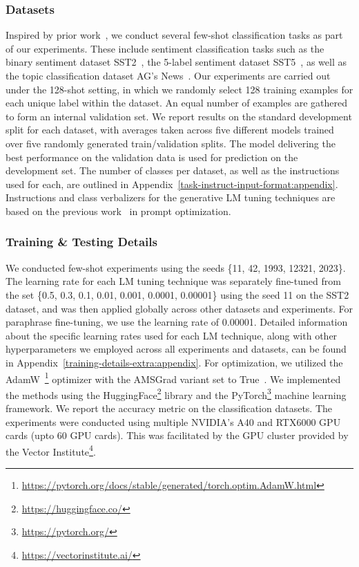 \documentclass[11pt]{article}
\begin{document}
\subsubsection{Datasets}
Inspired by prior work~\cite{gao-etal-2021-making, deng-etal-2022-rlprompt}, we conduct several few-shot classification tasks as part of our experiments. These include sentiment classification tasks such as the binary sentiment dataset SST2~\cite{socher-etal-2013-recursive}, the 5-label sentiment dataset SST5~\cite{socher-etal-2013-recursive}, as well as the topic classification dataset AG's News~\cite{NIPS2015_250cf8b5}. Our experiments are carried out under the 128-shot setting, in which we randomly select 128 training examples for each unique label within the dataset. An equal number of examples are gathered to form an internal validation set. We report results on the standard development split for each dataset, with averages taken across five different models trained over five randomly generated train/validation splits. The model delivering the best performance on the validation data is used for prediction on the development set. The number of classes per dataset, as well as the instructions used for each, are outlined in Appendix~\ref{task-instruct-input-format:appendix}. Instructions and class verbalizers for the generative LM tuning techniques are based on the previous work~\cite{deng-etal-2022-rlprompt} in prompt optimization.
\subsubsection{Training \& Testing Details}
We conducted few-shot experiments using the seeds \{11, 42, 1993, 12321, 2023\}. The learning rate for each LM tuning technique was separately fine-tuned from the set \{0.5, 0.3, 0.1, 0.01, 0.001, 0.0001, 0.00001\} using the seed 11 on the SST2 dataset, and was then applied globally across other datasets and experiments. For paraphrase fine-tuning, we use the learning rate of 0.00001. Detailed information about the specific learning rates used for each LM technique, along with other hyperparameters we employed across all experiments and datasets, can be found in Appendix~\ref{training-details-extra:appendix}. For optimization, we utilized the AdamW~\cite{DBLP:journals/corr/abs-1711-05101}\footnote{\url{https://pytorch.org/docs/stable/generated/torch.optim.AdamW.html}} optimizer with the AMSGrad variant set to True~\cite{DBLP:journals/corr/abs-1904-09237}. We implemented the methods using the HuggingFace\footnote{\url{https://huggingface.co/}} library and the PyTorch\footnote{\url{https://pytorch.org/}} machine learning framework. We report the accuracy metric on the classification datasets. The experiments were conducted using multiple NVIDIA's A40 and RTX6000 GPU cards (upto 60 GPU cards). This was facilitated by the GPU cluster provided by the Vector Institute\footnote{\url{https://vectorinstitute.ai/}}.
\end{document}
